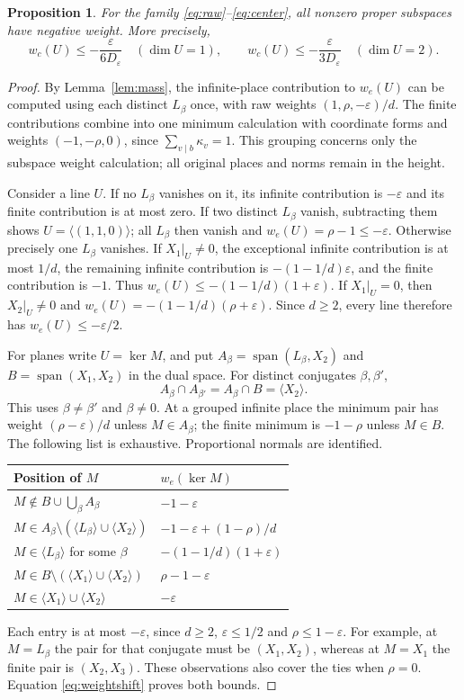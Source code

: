 \documentclass[11pt]{article}
\numberwithin{equation}{section}
\newtheorem{proposition}[theorem]{Proposition}
\theoremstyle{remark}\newtheorem{remark}[theorem]{Remark}
\newcommand{\eps}{\varepsilon}\newcommand{\LL}{\mathcal L}
\DeclareMathOperator{\spanop}{span}
\begin{document}
\begin{proposition}\label{prop:stable}
For the family \eqref{eq:raw}--\eqref{eq:center}, all nonzero proper
subspaces have negative weight. More precisely,
\[
 w_c(U)\le-\frac{\eps}{6D_\eps}\quad(\dim U=1),\qquad
 w_c(U)\le-\frac{\eps}{3D_\eps}\quad(\dim U=2).
\]
\end{proposition}
\begin{proof}
By Lemma~\ref{lem:mass}, the infinite-place contribution to $w_e(U)$
can be computed using each distinct $L_\beta$ once, with raw weights
$(1,\rho,-\eps)/d$. The finite contributions combine into one minimum
calculation with coordinate forms and weights $(-1,-\rho,0)$, since
$\sum_{v\mid b}\kappa_v=1$. This grouping concerns only the subspace
weight calculation; all original places and norms remain in the height.

Consider a line $U$. If no $L_\beta$ vanishes on it, its infinite
contribution is $-\eps$ and its finite contribution is at most zero.
If two distinct $L_\beta$ vanish, subtracting them shows
$U=\langle(1,1,0)\rangle$; all $L_\beta$ then vanish and
$w_e(U)=\rho-1\le-\eps$.
Otherwise precisely one $L_\beta$ vanishes. If $X_1|_U\ne0$, the
exceptional infinite contribution is at most $1/d$, the remaining
infinite contribution is $-(1-1/d)\eps$, and the finite contribution
is $-1$. Thus $w_e(U)\le-(1-1/d)(1+\eps)$.
If $X_1|_U=0$, then $X_2|_U\ne0$ and
$w_e(U)=-(1-1/d)(\rho+\eps)$.
Since $d\ge2$, every line therefore has $w_e(U)\le-\eps/2$.

For planes write $U=\ker M$, and put
$A_\beta=\spanop(L_\beta,X_2)$ and $B=\spanop(X_1,X_2)$ in the dual
space. For distinct conjugates $\beta,\beta'$,
\[
 A_\beta\cap A_{\beta'}=A_\beta\cap B=\langle X_2\rangle.
\]
This uses $\beta\ne\beta'$ and $\beta\ne0$.
At a grouped infinite place the minimum pair has weight
$(\rho-\eps)/d$ unless $M\in A_\beta$; the finite minimum is
$-1-\rho$ unless $M\in B$.
The following list is exhaustive. Proportional normals are identified.
\begin{center}\small
\begin{tabular}{@{}ll@{}}\toprule
Position of $M$ & $w_e(\ker M)$\\\midrule
$M\notin B\cup\bigcup_\beta A_\beta$ & $-1-\eps$\\
$M\in A_\beta\setminus(\langle L_\beta\rangle\cup\langle X_2\rangle)$
 & $-1-\eps+(1-\rho)/d$\\
$M\in\langle L_\beta\rangle$ for some $\beta$ & $-(1-1/d)(1+\eps)$\\
$M\in B\setminus(\langle X_1\rangle\cup\langle X_2\rangle)$ & $\rho-1-\eps$\\
$M\in\langle X_1\rangle\cup\langle X_2\rangle$ & $-\eps$\\\bottomrule
\end{tabular}
\end{center}
Each entry is at most $-\eps$, since $d\ge2$, $\eps\le1/2$ and
$\rho\le1-\eps$.
For example, at $M=L_\beta$ the pair for that conjugate must be
$(X_1,X_2)$, whereas at $M=X_1$ the finite pair is $(X_2,X_3)$.
These observations also cover the ties when $\rho=0$.
Equation \eqref{eq:weightshift} proves both bounds.
\end{proof}
\end{document}
